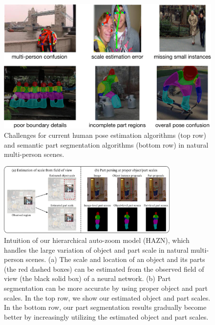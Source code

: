 \begin{figure}
 \includegraphics[width=1.0\linewidth]{figs/intro_hard.pdf}
\caption{Challenges for current human pose estimation algorithms (top row) and semantic part segmentation algorithms (bottom row) in natural multi-person scenes.}
\label{fig:challenge}
\end{figure}

\begin{figure}
\begin{center}
 \includegraphics[width=0.8\textwidth]{figs/intuition_eccv.pdf}
\end{center}
\caption{Intuition of our hierarchical auto-zoom model (HAZN), which handles the large variation of object and part scale in natural multi-person scenes. (a) The scale
and location of an object and its parts (the red dashed boxes) can be estimated
from the observed field of view (the black solid box) of a neural network. (b)
Part segmentation can be more accurate by using proper object and part scales. In the top row, we show our estimated object and part scales. In the bottom row,
our part segmentation results gradually become better by increasingly utilizing the
estimated object and part scales.}
\label{fig:motivation_eccv}
\end{figure}

